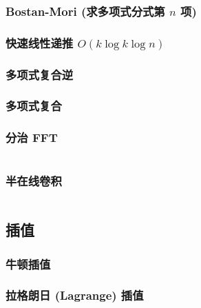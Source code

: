 \documentclass[a4paper, twoside]{article}
\begin{document}
\begin{multicols}{2}

				\subsubsection{Bostan-Mori (求多项式分式第 $n$ 项)}
					\label{BostanMori}
					
				
				\subsubsection{快速线性递推 $O(k\log k\log n)$}
					\label{LinearRecurrence}
					

				\subsubsection{多项式复合逆}
					\label{PolyCompositeInverse}
					
				
				\subsubsection{多项式复合}
					

				\subsubsection{分治 FFT}
					\inputminted{cpp}{../src/math/分治FFT.cpp}

				\subsubsection{半在线卷积}
					\inputminted{cpp}{../src/math/半在线卷积.cpp}

			\subsection{插值}
				\subsubsection{牛顿插值}
					

				\subsubsection{拉格朗日 (Lagrange) 插值}
					
				

\end{multicols}
\end{document}
